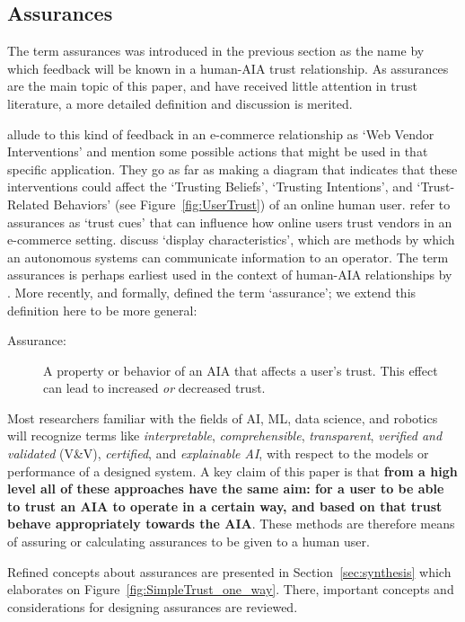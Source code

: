 \subsection{Assurances} \label{sec:assurances}
    The term assurances was introduced in the previous section as the name by which feedback will be known in a human-AIA trust relationship. As assurances are the main topic of this paper, and have received little attention in trust literature, a more detailed definition and discussion is merited.

    \citet{McKnight2001-fa} allude to this kind of feedback in an e-commerce relationship as `Web Vendor Interventions' and mention some possible actions that might be used in that specific application. They go as far as making a diagram that indicates that these interventions could affect the `Trusting Beliefs', `Trusting Intentions', and `Trust-Related Behaviors' (see Figure~\ref{fig:UserTrust}) of an online human user. \citet{Corritore2003-gx} refer to assurances as `trust cues' that can influence how online users trust vendors in an e-commerce setting. \citet{Lee2004-pv} discuss `display characteristics', which are methods by which an autonomous systems can communicate information to an operator. The term assurances is perhaps earliest used in the context of human-AIA relationships by \citet{Sheridan1984-kx}. More recently, and formally, \citet{Lillard2016-yg} defined the term `assurance'; we extend this definition here to be more general:    
    \begin{description}
        \item [Assurance:] A property or behavior of an AIA that affects a user's trust. This effect can lead to increased \emph{or} decreased trust. 
    \end{description}

    Most researchers familiar with the fields of AI, ML, data science, and robotics will recognize terms like \emph{interpretable}, \emph{comprehensible}, \emph{transparent}, \emph{verified and validated} (V\&V), \emph{certified}, and \emph{explainable AI}, with respect to the models or performance of a designed system. A key claim of this paper is that \textbf{from a high level all of these approaches have the same aim: for a user to be able to trust an AIA to operate in a certain way, and based on that trust behave appropriately towards the AIA}. These methods are therefore means of assuring or calculating assurances to be given to a human user.

    Refined concepts about assurances are presented in Section~\ref{sec:synthesis} which elaborates on Figure~\ref{fig:SimpleTrust_one_way}. There, important concepts and considerations for designing assurances are reviewed. 
